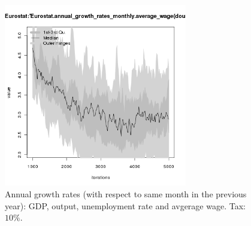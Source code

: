 \begin{figure}[H!]
\begin{minipage}{17cm}
\includegraphics[width=8cm]{./png/tax_0.10/Eurostat-annual_growth_rates_monthly_average_wage.png}
\end{minipage}
\caption{Annual growth rates (with respect to same month in the previous year): GDP, output, unemployment rate and avgerage wage. Tax: $10\%$.}
\label{Figure: Eurostat macrodata growth rates}
\end{figure}
\clearpage

